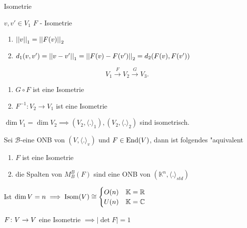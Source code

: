 \documentclass[class=article, crop=false]{standalone}
\begin{document}
\begin{zettel}{Isometrie}
\begin{remark}
$v,v' \in  V_1$ $F$ - Isometrie
\begin{enumerate}
    \item $ \left|\left|v\right|\right|_1 = \left|\left|F(v)\right|\right|_2$ 
    \item $d_1 (v,v') = \left|\left|v-v'\right|\right|_1 = \left|\left|F(v)-F(v')\right|\right|_2 = d_2 (F(v),F(v'))$ 
\end{enumerate}
\end{remark}

\begin{remark}
\[
    V_1 \stackrel{F}{\to} V_2 \stackrel{G}{\to} V_3
.\]
\begin{enumerate}
    \item $G \circ  F$ ist eine Isometrie
    \item $F^{-1}: V_2 \to  V_1$ ist eine Isometrie
\end{enumerate}

\end{remark}


\begin{corollary}
$\dim V_1 = \dim V_2 \implies  (V_2, \langle .\rangle_1), (V_2, \langle .\rangle_2)$  sind isometrisch.
\end{corollary}

\begin{theorem}[7.5]
    Sei $\mathcal{B}$-eine ONB von $(V, \langle .\rangle_v)$ und $F \in  \operatorname{End}(V)$, dann ist folgendes "aquivalent
    \begin{enumerate}
        \item $F$ ist eine Isometrie
        \item die Spalten von $M_B^B (F) $ sind eine ONB von $( \mathbb{K}^n, \langle .\rangle_{std})$ 
    \end{enumerate}
\end{theorem}

\begin{corollary}
Ist $\dim V =n \implies \operatorname{Isom} (V) \cong \begin{cases} O (n) & \mathbb{K} = \mathbb{R} \\ U (n) & \mathbb{K} = \mathbb{C} \end{cases} $ 
\end{corollary}

\begin{corollary}
$F \colon V\to V$ eine Isometrie $\implies |\det F| =1$ 
\end{corollary}
\end{zettel}
\end{document}
